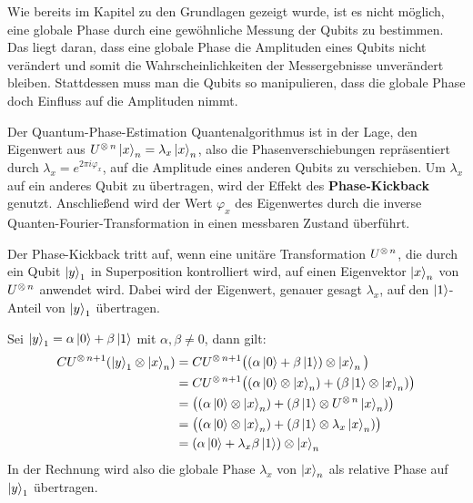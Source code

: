Wie bereits im Kapitel zu den Grundlagen gezeigt wurde, 
ist es nicht möglich, eine globale Phase durch eine gewöhnliche Messung der Qubits zu bestimmen. 
Das liegt daran, dass eine globale Phase die Amplituden eines Qubits nicht verändert und 
somit die Wahrscheinlichkeiten der Messergebnisse unverändert bleiben. 
Stattdessen muss man die Qubits so manipulieren, 
dass die globale Phase doch Einfluss auf die Amplituden nimmt.

Der Quantum-Phase-Estimation Quantenalgorithmus ist in der Lage, 
den Eigenwert aus \(U^{\operatorname{\otimes} n}\ket{x}_n=\lambda_x\ket{x}_n\), 
also die Phasenverschiebungen repräsentiert durch \(\lambda_x = e^{2\pi i \varphi_x}\),
auf die Amplitude eines anderen Qubits zu verschieben.
Um \(\lambda_x\) auf ein anderes Qubit zu übertragen, 
wird der Effekt des \textbf{Phase-Kickback} genutzt.
Anschließend wird der Wert \(\varphi_x\) des Eigenwertes durch die inverse Quanten-Fourier-Transformation in einen messbaren Zustand überführt.

Der Phase-Kickback tritt auf, 
wenn eine unitäre Transformation \(U^{\operatorname{\otimes} n}\), die durch ein Qubit \(\ket{y}_1\) in Superposition kontrolliert wird,
auf einen Eigenvektor \(\ket{x}_n\) von \(U^{\operatorname{\otimes} n}\) anwendet wird.
Dabei wird der Eigenwert, genauer gesagt \(\lambda_x\), 
auf den \(\ket{1}\)-Anteil von \(\ket{y}_1\) übertragen.

Sei \( \ket{y}_1 = \alpha\ket{0} + \beta\ket{1} \) mit \( \alpha,\beta \neq 0 \), dann gilt:
\begin{align*}
  CU^{\operatorname{\otimes} n+1}(\ket{y}_1 \otimes \ket{x}_n) 
  &= CU^{\operatorname{\otimes} n+1}\big((\alpha\ket{0} + \beta\ket{1}) \otimes \ket{x}_n\big) \\
  &= CU^{\operatorname{\otimes} n+1}\big((\alpha\ket{0}\otimes\ket{x}_n) + (\beta\ket{1}\otimes \ket{x}_n)\big) \\
  &= \big((\alpha\ket{0}\otimes\ket{x}_n) + (\beta\ket{1}\otimes U^{\operatorname{\otimes} n}\ket{x}_n)\big) \\
  &= \big((\alpha\ket{0}\otimes\ket{x}_n) + (\beta\ket{1}\otimes \lambda_x\ket{x}_n)\big) \\
  &= (\alpha\ket{0} + \lambda_x\beta\ket{1}) \otimes \ket{x}_n
\end{align*}
In der Rechnung wird also die globale Phase \(\lambda_x\) von \(\ket{x}_n\) als relative Phase auf \(\ket{y}_1\) übertragen.

